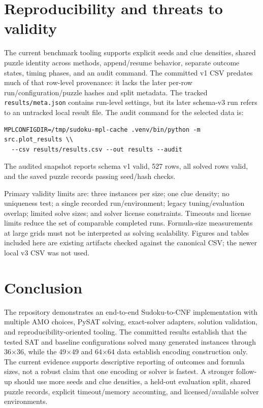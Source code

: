 \IfFileExists{cas-sc.cls}{\documentclass[a4paper,fleqn]{cas-sc}}{\documentclass[a4paper,11pt]{article}}
\begin{document}
\section{Reproducibility and threats to validity}
The current benchmark tooling supports explicit seeds and clue densities, shared puzzle identity across methods, append/resume behavior, separate outcome states, timing phases, and an audit command. The committed v1 CSV predates much of that row-level provenance: it lacks the later per-row run/configuration/puzzle hashes and split metadata. The tracked \texttt{results/meta.json} contains run-level settings, but its later schema-v3 run refers to an untracked local result file. The audit command for the selected data is:
\begin{verbatim}
MPLCONFIGDIR=/tmp/sudoku-mpl-cache .venv/bin/python -m src.plot_results \\
  --csv results/results.csv --out results --audit
\end{verbatim}
The audited snapshot reports schema v1 valid, 527 rows, all solved rows valid, and the saved puzzle records passing seed/hash checks.

Primary validity limits are: three instances per size; one clue density; no uniqueness test; a single recorded run/environment; legacy tuning/evaluation overlap; limited solve sizes; and solver license constraints. Timeouts and license limits reduce the set of comparable completed runs. Formula-size measurements at large grids must not be interpreted as solving scalability. Figures and tables included here are existing artifacts checked against the canonical CSV; the newer local v3 CSV was not used.

\section{Conclusion}
The repository demonstrates an end-to-end Sudoku-to-CNF implementation with multiple AMO choices, PySAT solving, exact-solver adapters, solution validation, and reproducibility-oriented tooling. The committed results establish that the tested SAT and baseline configurations solved many generated instances through 36$\times$36, while the 49$\times$49 and 64$\times$64 data establish encoding construction only. The current evidence supports descriptive reporting of outcomes and formula sizes, not a robust claim that one encoding or solver is fastest. A stronger follow-up should use more seeds and clue densities, a held-out evaluation split, shared puzzle records, explicit timeout/memory accounting, and licensed/available solver environments.
\end{document}
